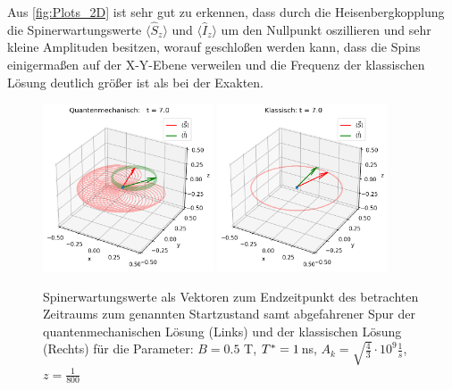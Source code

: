 Aus \autoref{fig:Plots_2D} ist sehr gut zu erkennen, dass durch die Heisenbergkopplung die Spinerwartungswerte $\langle\hat{S}_z \rangle$ 
und $\langle\hat{I}_z \rangle$ um den Nullpunkt oszillieren und sehr kleine Amplituden besitzen, worauf geschloßen werden kann, dass die 
Spins einigermaßen auf der X-Y-Ebene verweilen und die Frequenz der klassischen Lösung deutlich größer ist als bei der Exakten.
\begin{figure}[h!]
    \centering
    \includegraphics[width = 0.45\textwidth]{Abbildungen/Plot_Vektor_Quant.png}
    \includegraphics[width = 0.45\textwidth]{Abbildungen/Plot_Vektor_Klassisch.png}
    \caption{Spinerwartungswerte als Vektoren zum Endzeitpunkt des betrachten Zeitraums zum genannten Startzustand samt abgefahrener Spur der
    quantenmechanischen Lösung (Links) und der klassischen Lösung (Rechts) für die Parameter: $B = 0.5$ T, $T^*= 1 \thinspace$ns, $A_k = \sqrt{\frac{4}{3}}\cdot 10^9 \frac{1}{s}$,
    $z=\frac{1}{800}$}
    \label{fig:Plots_3D}
\end{figure}

